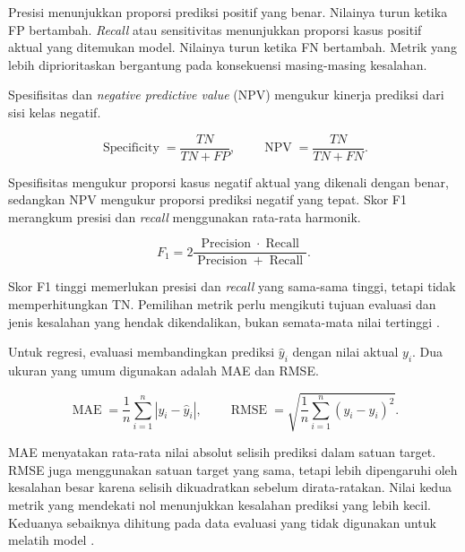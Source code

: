 Presisi menunjukkan proporsi prediksi positif yang benar. Nilainya turun ketika FP bertambah. \textit{Recall} atau sensitivitas menunjukkan proporsi kasus positif aktual yang ditemukan model. Nilainya turun ketika FN bertambah. Metrik yang lebih diprioritaskan bergantung pada konsekuensi masing-masing kesalahan.

Spesifisitas dan \textit{negative predictive value} (NPV) mengukur kinerja prediksi dari sisi kelas negatif.

\begin{equation}
    \operatorname{Specificity}=\frac{TN}{TN+FP},
    \qquad
    \operatorname{NPV}=\frac{TN}{TN+FN}.
    \label{eq:specificity-npv}
\end{equation}

Spesifisitas mengukur proporsi kasus negatif aktual yang dikenali dengan benar, sedangkan NPV mengukur proporsi prediksi negatif yang tepat. Skor F1 merangkum presisi dan \textit{recall} menggunakan rata-rata harmonik.

\begin{equation}
    F_1=2\frac{\operatorname{Precision}\cdot\operatorname{Recall}}{\operatorname{Precision}+\operatorname{Recall}}.
    \label{eq:f1-score}
\end{equation}

Skor F1 tinggi memerlukan presisi dan \textit{recall} yang sama-sama tinggi, tetapi tidak memperhitungkan TN. Pemilihan metrik perlu mengikuti tujuan evaluasi dan jenis kesalahan yang hendak dikendalikan, bukan semata-mata nilai tertinggi \cite{scikitlearn_metrics}.

Untuk regresi, evaluasi membandingkan prediksi $\hat{y}_i$ dengan nilai aktual $y_i$. Dua ukuran yang umum digunakan adalah MAE dan RMSE.

\begin{equation}
    \operatorname{MAE}=\frac{1}{n}\sum_{i=1}^{n}|y_i-\hat{y}_i|,
    \qquad
    \operatorname{RMSE}=\sqrt{\frac{1}{n}\sum_{i=1}^{n}(y_i-\hat{y}_i)^2}.
    \label{eq:regression-errors}
\end{equation}

MAE menyatakan rata-rata nilai absolut selisih prediksi dalam satuan target. RMSE juga menggunakan satuan target yang sama, tetapi lebih dipengaruhi oleh kesalahan besar karena selisih dikuadratkan sebelum dirata-ratakan. Nilai kedua metrik yang mendekati nol menunjukkan kesalahan prediksi yang lebih kecil. Keduanya sebaiknya dihitung pada data evaluasi yang tidak digunakan untuk melatih model \cite{scikitlearn_metrics}.
